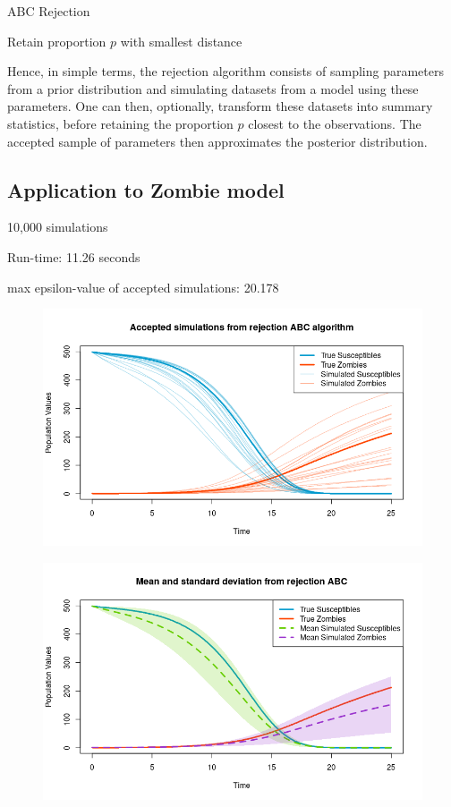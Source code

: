 \documentclass[]{article}
\begin{document}
	\begin{algorithm}[H]
		\label{ABC Rejection} 
		\caption{ABC Rejection}
		Retain proportion $p$ with smallest distance
	\end{algorithm}
	
	\noindent Hence, in simple terms, the rejection algorithm consists of sampling parameters from a prior distribution and simulating datasets from a model using these parameters. One can then, optionally, transform these datasets into summary statistics, before retaining the proportion $p$ closest to the observations. The accepted sample of parameters then approximates the posterior distribution.
	
	\subsection{Application to Zombie model}
	
	10,000 simulations
	
	Run-time: 11.26 seconds
	
	max epsilon-value of accepted simulations: 20.178
	
	\begin{figure}[H]
		\centering
		\includegraphics[width=0.8\linewidth]{../Figures/rej_ABC_simulations}
	\end{figure}
	
	\begin{figure}[H]
		\centering
		\includegraphics[width=0.8\linewidth]{../Figures/rej_abc_sd_bands}
	\end{figure}
	
\end{document}
